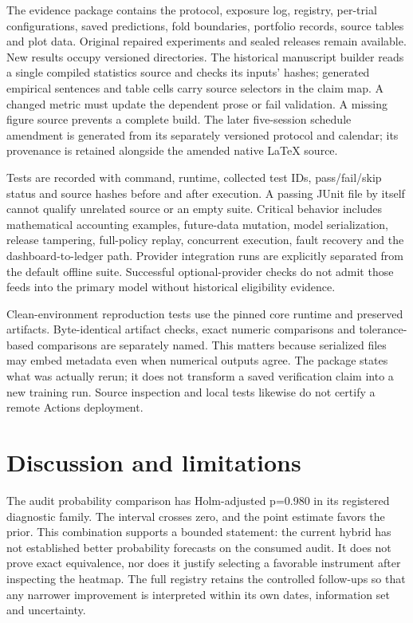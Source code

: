 \documentclass[11pt,a4paper]{article}
\begin{document}
The evidence package contains the protocol, exposure log, registry, per-trial configurations, saved predictions, fold boundaries, portfolio records, source tables and plot data. Original repaired experiments and sealed releases remain available. New results occupy versioned directories. The historical manuscript builder reads a single compiled statistics source and checks its inputs' hashes; generated empirical sentences and table cells carry source selectors in the claim map. A changed metric must update the dependent prose or fail validation. A missing figure source prevents a complete build. The later five-session schedule amendment is generated from its separately versioned protocol and calendar; its provenance is retained alongside the amended native LaTeX source.

Tests are recorded with command, runtime, collected test IDs, pass/fail/skip status and source hashes before and after execution. A passing JUnit file by itself cannot qualify unrelated source or an empty suite. Critical behavior includes mathematical accounting examples, future-data mutation, model serialization, release tampering, full-policy replay, concurrent execution, fault recovery and the dashboard-to-ledger path. Provider integration runs are explicitly separated from the default offline suite. Successful optional-provider checks do not admit those feeds into the primary model without historical eligibility evidence.

Clean-environment reproduction tests use the pinned core runtime and preserved artifacts. Byte-identical artifact checks, exact numeric comparisons and tolerance-based comparisons are separately named. This matters because serialized files may embed metadata even when numerical outputs agree. The package states what was actually rerun; it does not transform a saved verification claim into a new training run. Source inspection and local tests likewise do not certify a remote Actions deployment.


\section{Discussion and limitations}\label{sec:section-11}

The audit probability comparison has Holm-adjusted p=0.980 in its registered diagnostic family. The interval crosses zero, and the point estimate favors the prior. This combination supports a bounded statement: the current hybrid has not established better probability forecasts on the consumed audit. It does not prove exact equivalence, nor does it justify selecting a favorable instrument after inspecting the heatmap. The full registry retains the controlled follow-ups so that any narrower improvement is interpreted within its own dates, information set and uncertainty.
\end{document}
